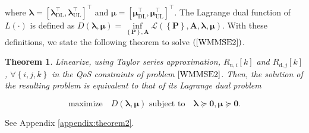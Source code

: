\documentclass[10pt,journal]{IEEEtran}
\newcommand{\paren}[1]{\left({#1}\right)}
\newcommand{\bracket}[1]{{\left [{#1}\right ]}}
\newcommand{\braces}[1]{{\left\{ {#1}\right\}}}
\newcommand{\rr}{_\mathrm{r}}
\newcommand{\B}{\textrm{B}}
\newcommand{\PiB}{\mathbf{P}_{\textrm{u},i}\bracket{k}}
\newcommand{\PBj}{\mathbf{P}_{\textrm{d},j}\bracket{k}}
\newtheorem{theorem}{Theorem}
\theoremstyle{definition}
\begin{document}
where $\boldsymbol{\lambda}=\bracket{\boldsymbol{\lambda}^\top_{\text{DL}},\boldsymbol{\lambda}^\top_{\text{UL}}}^\top$ and $\boldsymbol{\mu}=\bracket{\boldsymbol{\mu}^\top_{\text{DL}},\boldsymbol{\mu}^\top_{\text{UL}}}^\top$. The Lagrange dual function of $L\paren{\cdot}$ is defined as
$D\paren{\boldsymbol{\lambda},\boldsymbol{\mu}}=\underset{\braces{\mathbf{P}},\mathbf{A}}\inf \mathcal{L}\paren{\braces{\mathbf{P}},\mathbf{A},\boldsymbol{\lambda},\boldsymbol{\mu}}$. %
With these definitions, we state the following theorem to solve $\paren{\ref{WMMSE2}}$.
\begin{theorem}\label{theorem: dual}
Linearize, using Taylor series approximation, $R_{\textrm{u},i}\bracket{k}$ and $R_{\textrm{d},j}\bracket{k}$, $\forall\braces{i,j,k}$ in the QoS constraints of problem $\eqref{WMMSE2}$. Then, the solution of the resulting problem is equivalent to that of its Lagrange dual problem %
\par\noindent\small
\begin{equation}
\label{dualproblem}
\text{maximize} \quad D\paren{\boldsymbol{\lambda},\boldsymbol{\mu}}\text{  subject to}\quad  \boldsymbol{\lambda}  \succeq \mathbf{0}, \boldsymbol{\mu} \succeq \mathbf{0}.    
\end{equation}

\end{theorem}
\begin{IEEEproof}
See Appendix \ref{appendix:theorem2}.
\end{IEEEproof}

\end{document}
